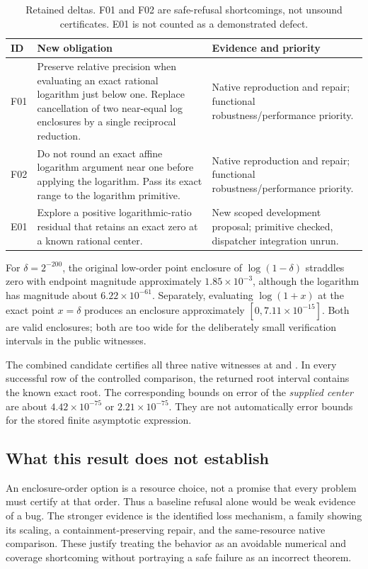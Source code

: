 \documentclass[11pt,letterpaper]{article}
\newcommand{\code}[1]{\texttt{\detokenize{#1}}}
\theoremstyle{remark}\newtheorem{remark}[proposition]{Remark}
\begin{document}
\begin{table}[htbp]
\centering\small
\begin{tabularx}{\textwidth}{@{}p{.5in}Yp{1.46in}@{}}
\toprule
ID & New obligation & Evidence and priority \\
\midrule
F01 & Preserve relative precision when evaluating an exact rational logarithm
just below one. Replace cancellation of two near-equal log enclosures by a
single reciprocal reduction. & Native reproduction and repair; functional
robustness/performance priority. \\
F02 & Do not round an exact affine logarithm argument near one before applying
the logarithm. Pass its exact range to the logarithm primitive. & Native
reproduction and repair; functional robustness/performance priority. \\
E01 & Explore a positive logarithmic-ratio residual that retains an exact
zero at a known rational center. & New scoped development proposal;
primitive checked, dispatcher integration unrun. \\
\bottomrule
\end{tabularx}
\caption{Retained deltas. F01 and F02 are safe-refusal shortcomings, not
unsound certificates. E01 is not counted as a demonstrated defect.}
\end{table}

For $\delta=2^{-200}$, the original low-order point enclosure of
$\log(1-\delta)$ straddles zero with endpoint magnitude approximately
$1.85\times10^{-3}$, although the logarithm has magnitude about
$6.22\times10^{-61}$. Separately, evaluating $\log(1+x)$ at the exact point
$x=\delta$ produces an enclosure approximately $[0,7.11\times10^{-15}]$.
Both are valid enclosures; both are too wide for the deliberately small
verification intervals in the public witnesses.

The combined candidate certifies all three native witnesses at
\code{"EnclosureOrder" -> 2} and \code{"MaxRefinements" -> 0}. In every
successful row of the controlled comparison, the returned root interval
contains the known exact root. The corresponding bounds on error of the
\emph{supplied center} are about $4.42\times10^{-75}$ or
$2.21\times10^{-75}$. They are not automatically error bounds for the stored
finite asymptotic expression.

\subsection{What this result does not establish}
An enclosure-order option is a resource choice, not a promise that every
problem must certify at that order. Thus a baseline refusal alone would be
weak evidence of a bug. The stronger evidence is the identified loss mechanism,
a family showing its scaling, a containment-preserving repair, and the
same-resource native comparison. These justify treating the behavior as an
avoidable numerical and coverage shortcoming without portraying a safe
failure as an incorrect theorem.
\end{document}
